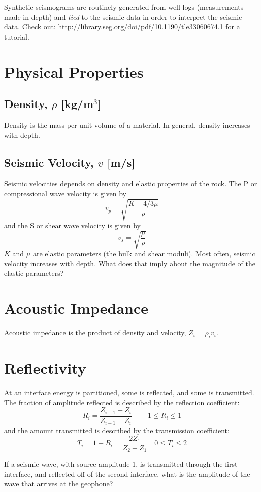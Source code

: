 \documentclass{article}[11pt,oneside]
\begin{document}
Synthetic seismograms are routinely generated from well logs (measurements made in depth) and \emph{tied} to the seismic data in order to interpret the seismic data.
Check out: http://library.seg.org/doi/pdf/10.1190/tle33060674.1 for a tutorial.


\section*{Physical Properties}
\subsection*{Density, $\rho$ [kg/m$^3$]}
Density is the mass per unit volume of a material. In general, density increases with depth.

\subsection*{Seismic Velocity, $v$ [m/s]}
Seismic velocities depends on density and elastic properties of the rock. The P or compressional wave velocity is given by
$$v_p = \sqrt{\frac{K + 4/3\mu}{\rho}}$$
and the S or shear wave velocity is given by
$$v_s = \sqrt{\frac{\mu}{\rho}}$$
$K$ and $\mu$ are elastic parameters (the bulk and shear moduli). Most often, seismic velocity increases with depth. What does that imply about the magnitude of the elastic parameters?


\section*{Acoustic Impedance}

Acoustic impedance is the product of density and velocity, $Z_i = \rho_i v_i$.

\section*{Reflectivity}
At an interface energy is partitioned, some is reflected, and some is transmitted. The fraction of amplitude reflected is described by the reflection coefficient:
$$R_i = \frac{Z_{i+1} - Z_i}{Z_{i+1}+Z_i} \quad -1 \leq R_i \leq 1$$
and the amount transmitted is described by the transmission coefficient:
$$T_i = 1-R_i = \frac{2Z_1}{Z_2+Z_1} \quad 0 \leq T_i \leq 2$$

If a seismic wave, with source amplitude 1, is transmitted through the first interface, and reflected off of the second interface, what is the amplitude of the wave that arrives at the geophone?
\end{document}
